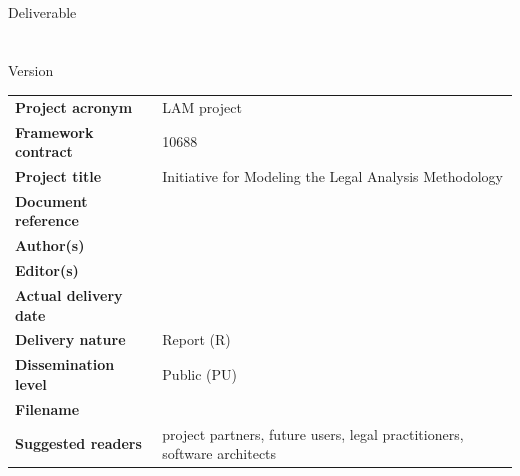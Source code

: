 \begin{titlepage}
\begin{center}
  \begin{spacing}{2.5}
    \textbf{\Huge \DelTitle}\\ \vspace{2cm}
    {\large Deliverable \DelNumber} \\ %
	{\large \DelAuthor} \\ %
	{\large \DelDate} \\ %
    {\large Version \DelVersion}
  \end{spacing}
  
  \vspace*{\fill}


\end{center}
\end{titlepage}

\clearpage


\setlength{\headheight}{1cm}
\setlength{\footskip}{18mm}
\addtolength{\textheight}{-\footskip}
\pagestyle{empty}

\clearpage



\vspace{6cm}

\begin{flushleft}
\begin{table}[!b]
	  \begin{tabular}{p{4.5cm}p{\textwidth-5cm}}
		\textbf{Project acronym}       &   LAM project\\
		\textbf{Framework contract}    &   10688 \\ 
		\textbf{Project title}    &   Initiative for Modeling the Legal Analysis Methodology  \\
		\textbf{Document reference} 	&   \DelTitle \\	
		\textbf{Author(s)}             &   \DelAuthor \\
		\textbf{Editor(s)}             &   \DelAuthor \\
		\textbf{Actual delivery date}  &   \DelDate \\    
		\textbf{Delivery nature}     	&   Report (R) \\
		\textbf{Dissemination level} 	&   Public (PU) \\
		\textbf{Filename}           	&   \DelFilename\\
		\textbf{Suggested readers}    	&   project partners, future users, legal practitioners, software architects\\
	\end{tabular}
\end{table}
\end{flushleft}



\clearpage

\clearpage





